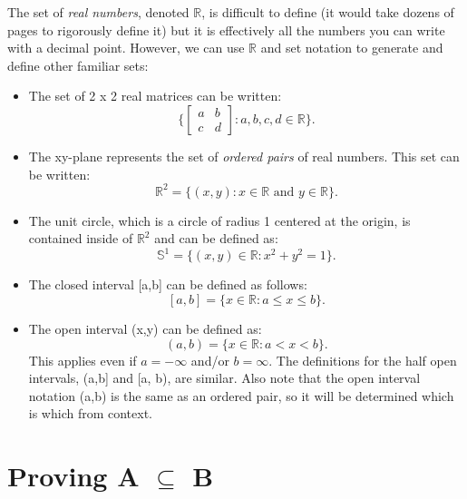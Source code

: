 \documentclass{report}
\begin{document}
The set of \emph{real numbers}, denoted $\mathbb{R}$, is difficult to define (it would take dozens of pages to rigorously define it) but it is effectively all the numbers you can write with a decimal point. However, we can use $\mathbb{R}$ and set notation to generate and define other familiar sets:
\begin{itemize}
  \item The set of 2 x 2 real matrices can be written:
        \[ \{\begin{bmatrix}
              a & b \\
              c & d
            \end{bmatrix} : a, b, c, d \in \mathbb{R}\}. \]
  \item The xy-plane represents the set of \emph{ordered pairs} of real numbers. This set can be written:
        \[ \mathbb{R}^2 = \{(x,y) : x \in \mathbb{R} \text{ and } y \in \mathbb{R}\}.  \]
  \item The unit circle, which is a circle of radius 1 centered at the origin, is contained inside of $\mathbb{R}^2$ and can be defined as:
        \[ \mathbb{S}^1 = \{(x,y) \in \mathbb{R} : x^2 + y^2 = 1\}.  \]
  \item The closed interval [a,b] can be defined as follows:
        \[ [a,b] = \{x \in \mathbb{R} : a \le x \le b\}.  \]
  \item The open interval (x,y) can be defined as:
        \[ (a,b) = \{x \in \mathbb{R} : a < x < b\}. \]
        This applies even if $a = -\infty$ and/or $b = \infty$. The definitions for the half open intervals, (a,b] and [a, b), are similar. Also note that the           open interval notation (a,b) is the same as an ordered pair, so it will be determined which is which from context.
\end{itemize}


\section{Proving A $\subseteq$ B}
\end{document}
